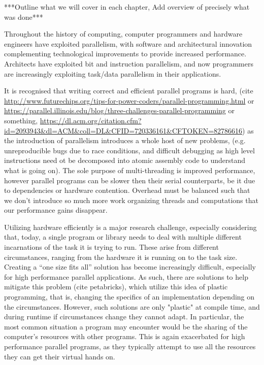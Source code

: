 
***Outline what we will cover in each chapter, Add overview of precisely what was done***

Throughout the history of computing, computer programmers and hardware engineers have exploited parallelism, with software and architectural innovation complementing technological improvements to provide increased performance. Architects have exploited bit and instruction parallelism, and now programmers are increasingly exploiting task/data parallelism in their applications.

It is recognised that writing correct and efficient parallel programs is hard, (cite \url{http://www.futurechips.org/tips-for-power-coders/parallel-programming.html} or \url{https://parallel.illinois.edu/blog/three-challenges-parallel-programming} or something, \url{https://dl.acm.org/citation.cfm?id=2093943&dl=ACM&coll=DL&CFID=720336161&CFTOKEN=82786616}) as the introduction of parallelism introduces a whole host of new problems, (e.g. unreproducible bugs due to race conditions, and difficult debugging as high level instructions need ot be decomposed  into atomic assembly code to understand what is going on). The sole purpose of multi-threading is improved performance, however parallel programs can be slower then their serial counterparts, be it due to dependencies or hardware contention. Overhead must be balanced such that we don't introduce so much more work organizing threads and computations that our performance gains disappear.

Utilizing hardware efficiently is a major research challenge, especially considering that, today, a single program or library needs to deal with multiple different incarnations of the task it is trying to run. These arise from different circumstances, ranging from the hardware it is running on to the task size. Creating a ``one size fits all'' solution has become increasingly difficult, especially for high performance parallel applications. As such, there are solutions to help mitigate this problem (cite petabricks), which utilize this idea of plastic programming, that is, changing the specifics of an implementation depending on the circumstances. However, such solutions are only "plastic" at compile time, and during runtime if circumstances change they cannot adapt. In particular, the most common situation a program may encounter would be the sharing of the computer's resources with other programs. This is again exacerbated for high performance parallel programs, as they typically attempt to use all the resources they can get their virtual hands on.

